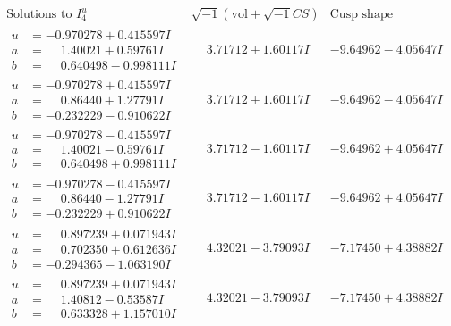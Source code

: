\documentclass[1p]{elsarticle_modified}
\theoremstyle{definition}
\newcommand{\I}{\sqrt{-1}}
\begin{document}
$$\begin{array}{c|c|c}  
\text{Solutions to }I^u_{4}& \I (\text{vol} + \sqrt{-1}CS) & \text{Cusp shape}\\
 \hline 
\begin{aligned}
u &= -0.970278 + 0.415597 I \\
a &= \phantom{-}1.40021 + 0.59761 I \\
b &= \phantom{-}0.640498 - 0.998111 I\end{aligned}
 & \phantom{-}3.71712 + 1.60117 I & -9.64962 - 4.05647 I \\ \hline\begin{aligned}
u &= -0.970278 + 0.415597 I \\
a &= \phantom{-}0.86440 + 1.27791 I \\
b &= -0.232229 - 0.910622 I\end{aligned}
 & \phantom{-}3.71712 + 1.60117 I & -9.64962 - 4.05647 I \\ \hline\begin{aligned}
u &= -0.970278 - 0.415597 I \\
a &= \phantom{-}1.40021 - 0.59761 I \\
b &= \phantom{-}0.640498 + 0.998111 I\end{aligned}
 & \phantom{-}3.71712 - 1.60117 I & -9.64962 + 4.05647 I \\ \hline\begin{aligned}
u &= -0.970278 - 0.415597 I \\
a &= \phantom{-}0.86440 - 1.27791 I \\
b &= -0.232229 + 0.910622 I\end{aligned}
 & \phantom{-}3.71712 - 1.60117 I & -9.64962 + 4.05647 I \\ \hline\begin{aligned}
u &= \phantom{-}0.897239 + 0.071943 I \\
a &= \phantom{-}0.702350 + 0.612636 I \\
b &= -0.294365 - 1.063190 I\end{aligned}
 & \phantom{-}4.32021 - 3.79093 I & -7.17450 + 4.38882 I \\ \hline\begin{aligned}
u &= \phantom{-}0.897239 + 0.071943 I \\
a &= \phantom{-}1.40812 - 0.53587 I \\
b &= \phantom{-}0.633328 + 1.157010 I\end{aligned}
 & \phantom{-}4.32021 - 3.79093 I & -7.17450 + 4.38882 I \\ \hline\begin{aligned}

\end{aligned}
\end{array}$$
\end{document}
